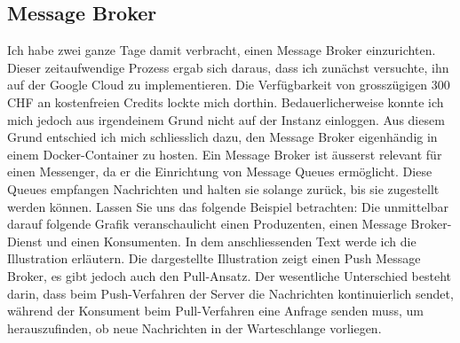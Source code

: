 \subsection{Message Broker}
Ich habe zwei ganze Tage damit verbracht, einen Message Broker einzurichten. Dieser zeitaufwendige Prozess ergab sich daraus, dass ich zunächst versuchte, ihn auf der Google Cloud zu implementieren. Die Verfügbarkeit von grosszügigen 300 CHF an kostenfreien Credits lockte mich dorthin. Bedauerlicherweise konnte ich mich jedoch aus irgendeinem Grund nicht auf der Instanz einloggen. Aus diesem Grund entschied ich mich schliesslich dazu, den Message Broker eigenhändig in einem Docker-Container zu hosten. Ein Message Broker ist äusserst relevant für einen Messenger, da er die Einrichtung von Message Queues ermöglicht. Diese Queues empfangen Nachrichten und halten sie solange zurück, bis sie zugestellt werden können. Lassen Sie uns das folgende Beispiel betrachten: Die unmittelbar darauf folgende Grafik veranschaulicht einen Produzenten, einen Message Broker-Dienst und einen Konsumenten. In dem anschliessenden Text werde ich die Illustration erläutern. Die dargestellte Illustration zeigt einen Push Message Broker, es gibt jedoch auch den Pull-Ansatz. Der wesentliche Unterschied besteht darin, dass beim Push-Verfahren der Server die Nachrichten kontinuierlich sendet, während der Konsument beim Pull-Verfahren eine Anfrage senden muss, um herauszufinden, ob neue Nachrichten in der Warteschlange vorliegen.\\\\
\\
